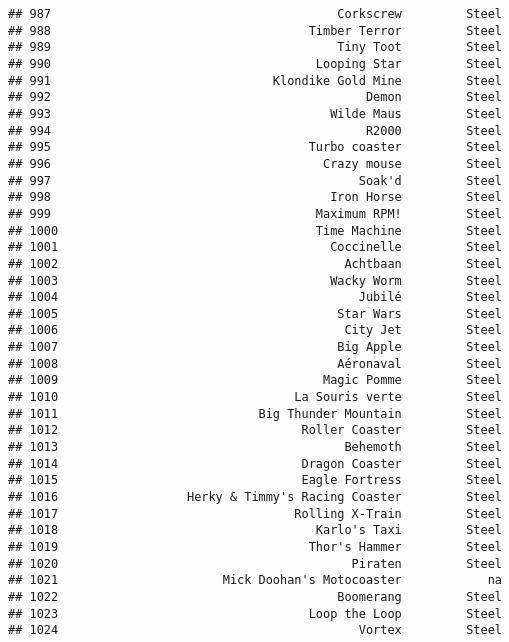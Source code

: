 \documentclass[
]{article}
\begin{document}
\begin{verbatim}
## 987                                        Corkscrew         Steel
## 988                                    Timber Terror         Steel
## 989                                        Tiny Toot         Steel
## 990                                     Looping Star         Steel
## 991                               Klondike Gold Mine         Steel
## 992                                            Demon         Steel
## 993                                       Wilde Maus         Steel
## 994                                            R2000         Steel
## 995                                    Turbo coaster         Steel
## 996                                      Crazy mouse         Steel
## 997                                           Soak'd         Steel
## 998                                       Iron Horse         Steel
## 999                                     Maximum RPM!         Steel
## 1000                                    Time Machine         Steel
## 1001                                      Coccinelle         Steel
## 1002                                        Achtbaan         Steel
## 1003                                      Wacky Worm         Steel
## 1004                                          Jubilé         Steel
## 1005                                       Star Wars         Steel
## 1006                                        City Jet         Steel
## 1007                                       Big Apple         Steel
## 1008                                       Aéronaval         Steel
## 1009                                     Magic Pomme         Steel
## 1010                                 La Souris verte         Steel
## 1011                            Big Thunder Mountain         Steel
## 1012                                  Roller Coaster         Steel
## 1013                                        Behemoth         Steel
## 1014                                  Dragon Coaster         Steel
## 1015                                  Eagle Fortress         Steel
## 1016                  Herky & Timmy's Racing Coaster         Steel
## 1017                                 Rolling X-Train         Steel
## 1018                                    Karlo's Taxi         Steel
## 1019                                   Thor's Hammer         Steel
## 1020                                         Piraten         Steel
## 1021                       Mick Doohan's Motocoaster            na
## 1022                                       Boomerang         Steel
## 1023                                   Loop the Loop         Steel
## 1024                                          Vortex         Steel

\end{verbatim}
\end{document}
